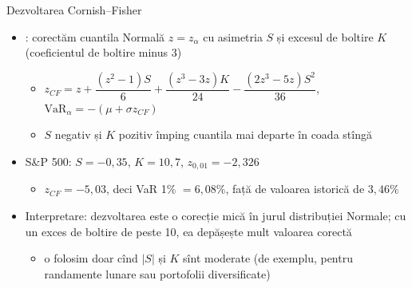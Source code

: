 \begin{frame}{Dezvoltarea Cornish--Fisher}
\itemsize{\footnotesize}
\begin{itemize}
    \item {}: corectăm cuantila Normală $z = z_\alpha$ cu asimetria $S$ și excesul de boltire $K$ (coeficientul de boltire minus 3)
    \begin{itemize}
        \item $z_{CF} = z + \dfrac{(z^2 - 1)S}{6} + \dfrac{(z^3 - 3z)K}{24} - \dfrac{(2z^3 - 5z)S^2}{36}$, \quad $\mathrm{VaR}_\alpha = -(\mu + \sigma z_{CF})$
        \item $S$ negativ și $K$ pozitiv împing cuantila mai departe în coada stîngă
    \end{itemize}
    \item S\&P 500: $S = -0{,}35$, $K = 10{,}7$, $z_{0{,}01} = -2{,}326$
    \begin{itemize}
        \item $z_{CF} = -5{,}03$, deci VaR 1\% $= 6{,}08\%$, față de valoarea istorică de $3{,}46\%$
    \end{itemize}
    \item Interpretare: dezvoltarea este o corecție mică în jurul distribuției Normale; cu un exces de boltire de peste 10, ea depășește mult valoarea corectă
    \begin{itemize}
        \item o folosim doar cînd $|S|$ și $K$ sînt moderate (de exemplu, pentru randamente lunare sau portofolii diversificate)
    \end{itemize}
\end{itemize}
\end{frame}

